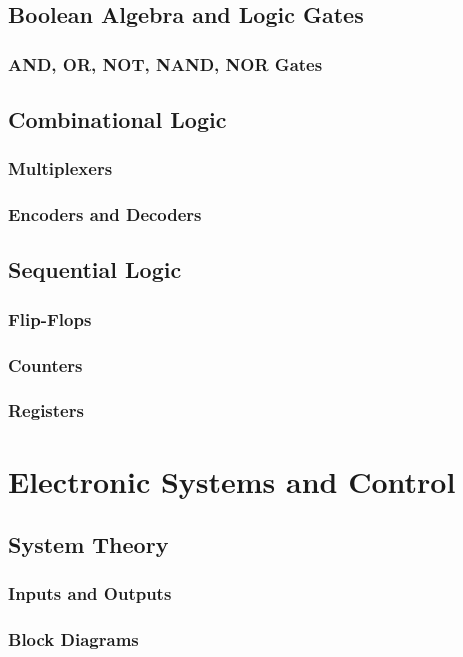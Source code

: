 \documentclass[11pt]{article}
\begin{document}
\subsection{Boolean Algebra and Logic Gates} \label{subsec:boolean_logic}
\subsubsection{AND, OR, NOT, NAND, NOR Gates}
\subsection{Combinational Logic} \label{subsec:combinational_logic}
\subsubsection{Multiplexers}
\subsubsection{Encoders and Decoders}
\subsection{Sequential Logic} \label{subsec:sequential_logic}
\subsubsection{Flip-Flops}
\subsubsection{Counters}
\subsubsection{Registers}

\section{Electronic Systems and Control} \label{sec:systems_control}
\subsection{System Theory} \label{subsec:system_theory}
\subsubsection{Inputs and Outputs}
\subsubsection{Block Diagrams}
\end{document}
